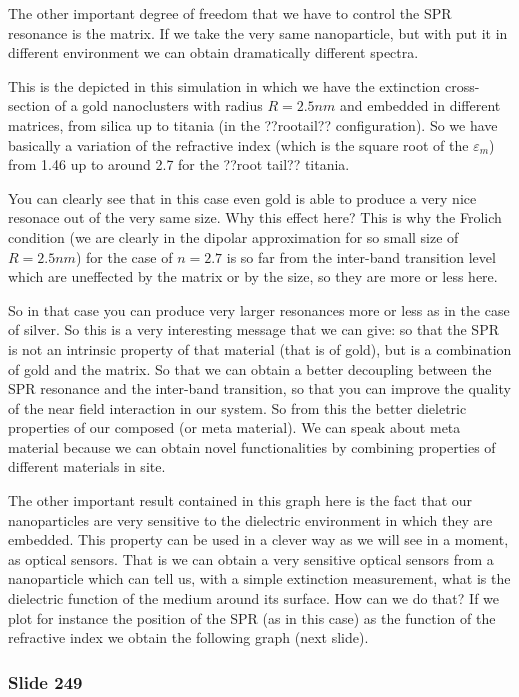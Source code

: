 \documentclass[../main/main.tex]{subfiles}
\begin{document}
The other important degree of freedom that we have to control the SPR resonance is the matrix. If we take the very same nanoparticle, but with put it in different environment we can obtain dramatically different spectra.

This is the depicted in this simulation in which we have the extinction cross-section of a gold nanoclusters with radius \( R=2.5nm \) and embedded in different matrices, from silica up to titania (in the ??rootail?? configuration). So we have basically a variation of the refractive index (which is the square root of the \( \varepsilon _m \)) from 1.46 up to around 2.7 for the ??root tail?? titania.

You can clearly see that in this case even gold is able to produce a very nice resonace out of the very same size. Why this effect here?
This is why the Frolich condition (we are clearly in the dipolar approximation for so small size of \( R=2.5nm \)) for the case of \( n=2.7 \) is so far from the inter-band transition level which are uneffected by the matrix or by the size, so they are more or less here.

So in that case you can produce very larger resonances more or less as in the case of silver. So this is a very interesting message that we can give: so that the SPR is not an intrinsic property of that material (that is of gold), but is a combination of gold and the matrix.
So that we can obtain a better decoupling between the SPR resonance and the inter-band transition, so that you can improve the quality of the near field interaction in our system.
So from this the better dieletric properties of our composed (or meta material). We can speak about meta material because we can obtain novel functionalities by combining properties of different materials in site.

The other important result contained in this graph here is the fact that our nanoparticles are very sensitive to the dielectric environment in which they are embedded. This property can be used in a clever way as we will see in a moment, as optical sensors. That is we can obtain a very sensitive optical sensors from a nanoparticle which can tell us, with a simple extinction measurement, what is the dielectric function of the medium around its surface.
How can we do that? If we plot for instance the position of the SPR (as in this case) as the function of the refractive index we obtain the following graph (next slide).

\newpage

\subsubsection{Slide 249}
\end{document}
